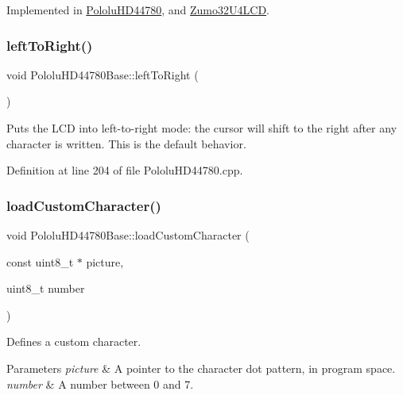 Implemented in \hyperlink{class_pololu_h_d44780_a876723b26f2dc081bf7f29019079489b}{Pololu\+H\+D44780}, and \hyperlink{class_zumo32_u4_l_c_d_a15ad296b2faa2196760b816301983ea5}{Zumo32\+U4\+L\+CD}.

\mbox{\label{class_pololu_h_d44780_base_ada551bdb01681eb57bec325778eb38a6}} 
\subsubsection{\texorpdfstring{left\+To\+Right()}{leftToRight()}}
{\footnotesize\ttfamily void Pololu\+H\+D44780\+Base\+::left\+To\+Right (\begin{DoxyParamCaption}{ }\end{DoxyParamCaption})}

Puts the L\+CD into left-\/to-\/right mode\+: the cursor will shift to the right after any character is written. This is the default behavior. 

Definition at line 204 of file Pololu\+H\+D44780.\+cpp.

\mbox{\label{class_pololu_h_d44780_base_a73d331af44ec2e624aa0468ce13f64e4}} 
\subsubsection{\texorpdfstring{load\+Custom\+Character()}{loadCustomCharacter()}\hspace{0.1cm}{\footnotesize\ttfamily [1/2]}}
{\footnotesize\ttfamily void Pololu\+H\+D44780\+Base\+::load\+Custom\+Character (\begin{DoxyParamCaption}\item[{const uint8\+\_\+t $\ast$}]{picture,  }\item[{uint8\+\_\+t}]{number }\end{DoxyParamCaption})}

Defines a custom character. 
\begin{DoxyParams}{Parameters}
{\em picture} & A pointer to the character dot pattern, in program space. \\
\hline
{\em number} & A number between 0 and 7. \\
\hline
\end{DoxyParams}


